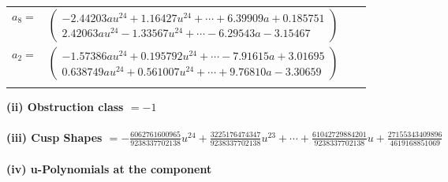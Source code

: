 \documentclass[1p]{elsarticle_modified}
\theoremstyle{definition}
\begin{document}
\begin{tabular}{m{7pt} m{180pt} m{7pt} m{180pt} }
\flushright $a_{8}=$&$\begin{pmatrix}-2.44203 a u^{24}+1.16427 u^{24}+\cdots+6.39909 a+0.185751\\2.42063 a u^{24}-1.33567 u^{24}+\cdots-6.29543 a-3.15467\end{pmatrix}$ \\
\flushright $a_{2}=$&$\begin{pmatrix}-1.57386 a u^{24}+0.195792 u^{24}+\cdots-7.91615 a+3.01695\\0.638749 a u^{24}+0.561007 u^{24}+\cdots+9.76810 a-3.30659\end{pmatrix}$\\&\end{tabular}
\flushleft \textbf{(ii) Obstruction class $= -1$}\\~\\
\flushleft \textbf{(iii) Cusp Shapes $= -\frac{6062761600965}{9238337702138} u^{24}+\frac{3225176474347}{9238337702138} u^{23}+\cdots+\frac{61042729884201}{9238337702138} u+\frac{27155343409896}{4619168851069}$}\\~\\
\newpage\renewcommand{\arraystretch}{1}
\flushleft \textbf{(iv) u-Polynomials at the component}\newline \\
\end{document}
